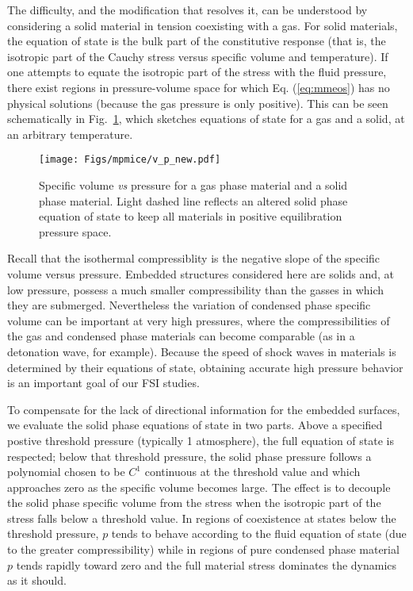 The difficulty, and the modification that resolves it, can be understood by
considering a solid material in tension coexisting with a gas.  For solid
materials, the equation of state is the bulk part of the constitutive response
(that is, the isotropic part of the Cauchy stress versus specific volume and
temperature).  If one attempts to equate the isotropic part of the stress
with the fluid pressure, there exist regions in pressure-volume space for
which Eq. (\ref{eq:mmeos}) has no physical solutions (because the gas pressure
is only positive).  This can be seen schematically in Fig.~\ref{fig:vpfig}, which
sketches equations of state for a gas and a solid, at an arbitrary temperature.

\begin{figure}[htbp!]
  \centering
  \texttt{[image: Figs/mpmice/v\_p\_new.pdf]}
  \caption{Specific volume \textit{vs} pressure for a gas phase material 
          and a solid phase material.  Light dashed line reflects an 
          altered solid phase equation of state to keep all materials
          in positive equilibration pressure space.}
  \label{fig:vpfig}
\end{figure}

Recall that the isothermal compressiblity is the negative slope of the
specific volume versus pressure.  Embedded structures considered here are
solids and, at low pressure, possess a much smaller compressibility than
the gasses in which they are submerged.  Nevertheless the variation of
condensed phase specific volume can be important at very high pressures,
where the compressibilities of the gas and condensed phase materials can
become comparable (as in a detonation wave, for example).  Because the speed of
shock waves in materials is determined by their equations of state, obtaining
accurate high pressure behavior is an important goal of our FSI studies.

To compensate for the lack of directional information for the embedded
surfaces, we evaluate the solid phase equations of state in two parts.
Above a specified postive threshold pressure (typically 1 atmosphere),
the full equation of state is respected; below that threshold pressure, the
solid phase pressure follows a polynomial chosen to be $C^1$ continuous at the
threshold value and which approaches zero as the specific volume becomes large.
The effect is to decouple the solid phase specific volume from the stress when
the isotropic part of the stress falls below a threshold value.  In regions
of coexistence at states below the threshold pressure, $p$ tends to behave
according to the fluid equation of state (due to the greater compressibility)
while in regions of pure condensed phase material $p$ tends rapidly toward
zero and the full material stress dominates the dynamics as it should.

